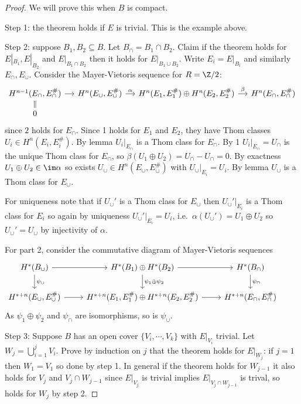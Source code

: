 \documentclass[a4paper]{article}
\begin{document}
\begin{proof}
  We will prove this when \(B\) is compact.

  Step 1: the theorem holds if \(E\) is trivial. This is the example above.

  Step 2: suppose \(B_1, B_2 \subseteq B\). Let \(B_\cap = B_1 \cap B_2\). Claim if the theorem holds for \(E|_{B_1}, E|_{B_2}\) and \(E|_{B_1 \cap B_2}\) then it holds for \(E|_{B_1 \cup B_2}\). Write \(E_i = E|_{B_i}\) and similarly \(E_\cap, E_\cup\). Consider the Mayer-Vietoris sequence for \(R = \Z/2\):
  \[
    \begin{tikzcd}[column sep=small,row sep=small]
      H^{n - 1}(E_\cap, E_\cap^\#) \ar[d, equal] \ar[r] & H^n(E_\cup, E_\cup^\#) \ar[r, "\alpha"] & H^n(E_1, E_1^\#) \oplus H^n(E_2, E_2^\#) \ar[r, "\beta"] & H^n(E_\cap, E_\cap^\#) \\
      0
    \end{tikzcd}
  \]
  since \(2\) holds for \(E_\cap\). Since 1 holds for \(E_1\) and \(E_2\), they have Thom classes \(U_i \in H^n(E_i, E_i^\#)\). By lemma \(U_i|_{E_\cap}\) is a Thom class for \(E_\cap\). By 1 \(U_i|_{E_\cap} = U_\cap\) is the unique Thom class for \(E_\cap\), so \(\beta(U_1 \oplus U_2) = U_\cap - U_\cap = 0\). By exactness \(U_1 \oplus U_2 \in \im \alpha\) so exists \(U_\cup \in H^n(E_\cup, E_\cup^\#)\) with \(U_\cup|_{E_i} = U_i\). By lemma \(U_\cup\) is a Thom class for \(E_\cup\).

  For uniqueness note that if \(U_\cup'\) is a Thom class for \(E_\cup\) then \(U_\cup'|_{E_i}\) is a Thom class for \(E_i\) so again by uniqueness \(U_\cup'|_{E_i} = U_i\), i.e.\ \(\alpha(U_\cup') = U_1 \oplus U_2\) so \(U_\cup' = U_\cup\) by injectivity of \(\alpha\).

  For part 2, consider the commutative diagram of Mayer-Vietoris sequences
  \[
    \begin{tikzcd}
      H^*(B_\cup) \ar[r] \ar[d, "\psi_\cup"] & H^*(B_1) \oplus H^*(B_2) \ar[r] \ar[d, "\psi_1 \oplus \psi_2"] & H^*(B_\cap) \ar[d, "\psi_\cap"] & \\
      H^{* + n}(E_\cup, E_\cup^\#) \ar[r] & H^{* + n}(E_1, E_1^\#) \oplus H^{* + n}(E_2, E_2^\#) \ar[r] & H^{* + n}(E_\cap, E_\cap^\#)
    \end{tikzcd}
  \]
  As \(\psi_1 \oplus \psi_2\) and \(\psi_\cap\) are isomorphisms, so is \(\psi_\cup\).

  Step 3: Suppose \(B\) has an open cover \(\{V_i, \cdots, V_k\}\) with \(E|_{V_i}\) trivial. Let \(W_j = \bigcup_{i = 1}^j V_i\). Prove by induction on \(j\) that the theorem holds for \(E|_{W_j}\): if \(j = 1\) then \(W_1 = V_1\) so done by step 1. In general if the theorem holds for \(W_{j - 1}\) it also holds for \(V_j\) and \(V_j \cap W_{j - 1}\) since \(E|_{V_j}\) is trivial implies \(E|_{V_j \cap W_{j - 1}}\) is trival, so holds for \(W_j\) by step 2.
\end{proof}
\end{document}
